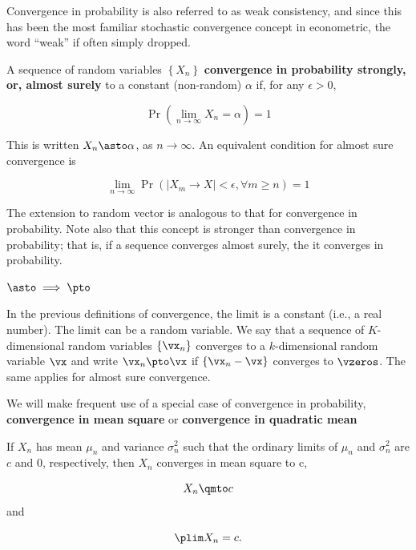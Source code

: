 \documentclass[english,12pt]{book}\usepackage[]{graphicx}\usepackage[]{xcolor}
\begin{document}
\begin{remark}
Convergence in probability is also referred to as weak consistency, and since this has been the most familiar stochastic convergence concept in econometric, the word ``weak'' if often simply dropped.
\end{remark}



\begin{definition}
	A sequence of random variables $\left\{X_n\right\}$ \textbf{convergence in probability strongly, or, almost surely} to a constant (non-random) $\alpha$ if, for any $\epsilon>0$,
	
	\begin{equation*}
	 \Pr\left(\lim_{n\to \infty}X_n = \alpha\right)=1
	\end{equation*}
	
	This is written $X_n\asto \alpha$, as $n\to \infty$. An equivalent condition for almost sure convergence is
	
	\begin{equation*}
	  \lim_{n\to \infty}\Pr\left(\left|X_m \to X\right| < \epsilon, \forall m\geq n\right) = 1
	\end{equation*}
\end{definition}

The extension to random vector is analogous to that for convergence in probability. Note also that this concept is stronger than convergence in probability; that is, if a sequence converges almost surely, the it converges in probability. 

\begin{remark}
  $\asto \implies \pto$
\end{remark}


In the previous definitions of convergence, the limit is a constant (i.e., a real number). The limit can be a random variable. We say that a sequence of $K$-dimensional random variables $\left \lbrace \vx_n\right\rbrace$ converges to a $k$-dimensional random variable $\vx$ and write $\vx_n\pto \vx$ if $\left\lbrace \vx_n - \vx\right\rbrace$ converges to $\vzeros$. The same applies for almost sure convergence.


We will make frequent use of a special case of convergence in probability, \textbf{convergence in mean square} or \textbf{convergence in quadratic mean}

\begin{theorem}\label{teo:conv_qm}
If $X_n$ has mean $\mu_n$ and variance $\sigma^2_n$ such that the ordinary limits of $\mu_n$ and $\sigma^2_n$ are $c$ and 0, respectively, then $X_n$ converges in mean square to c,

\begin{equation*}
  X_n\qmto c
\end{equation*}
%
and 

\begin{equation*}
  \plim X_n = c.
\end{equation*}
\end{theorem}
\end{document}
